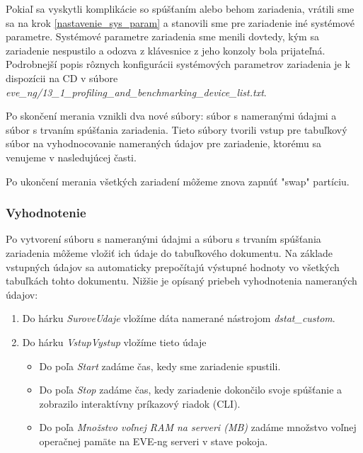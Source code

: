 Pokiaľ sa vyskytli komplikácie so spúšťaním alebo behom zariadenia, vrátili sme sa na krok \ref{nastavenie_sys_param} a stanovili sme pre zariadenie iné systémové parametre. Systémové parametre zariadenia sme menili dovtedy, kým sa zariadenie nespustilo a odozva z klávesnice z jeho konzoly bola prijateľná. Podrobnejší popis rôznych konfigurácii systémových parametrov zariadenia je k dispozícii na CD v súbore \emph{eve\_ng/13\_1\_profiling\_and\_benchmarking\_device\_list.txt}.

Po skončení merania vznikli dva nové súbory: súbor s nameranými údajmi a súbor s trvaním spúšťania zariadenia. Tieto súbory tvorili vstup pre tabuľkový súbor na vyhodnocovanie nameraných údajov pre zariadenie, ktorému sa venujeme v nasledujúcej časti.

Po ukončení merania všetkých zariadení môžeme znova zapnúť "swap" partíciu.




\subsubsection{Vyhodnotenie}
\label{chap:testovanie_zariadeni_benchmark_vyhodnotenie}

Po vytvorení súboru s nameranými údajmi a súboru s trvaním spúšťania zariadenia môžeme vložiť ich údaje do tabuľkového dokumentu. Na základe vstupných údajov sa automaticky prepočítajú výstupné hodnoty vo všetkých tabuľkách tohto dokumentu. Nižšie je opísaný priebeh vyhodnotenia nameraných údajov:

\begin{enumerate}[noitemsep]
    \item Do hárku \emph{SuroveUdaje} vložíme dáta namerané nástrojom \emph{dstat\_custom}.
    \item Do hárku \emph{VstupVystup} vložíme tieto údaje
    \begin{itemize}[noitemsep]
        \item Do poľa \emph{Start} zadáme čas, kedy sme zariadenie spustili.
        \item Do poľa \emph{Stop} zadáme čas, kedy zariadenie dokončilo svoje spúšťanie a zobrazilo interaktívny príkazový riadok (CLI).
        \item Do poľa \emph{Množstvo voľnej RAM na serveri (MB)} zadáme množstvo voľnej operačnej pamäte na EVE-ng serveri v stave pokoja.
    \end{itemize}
\end{enumerate}

